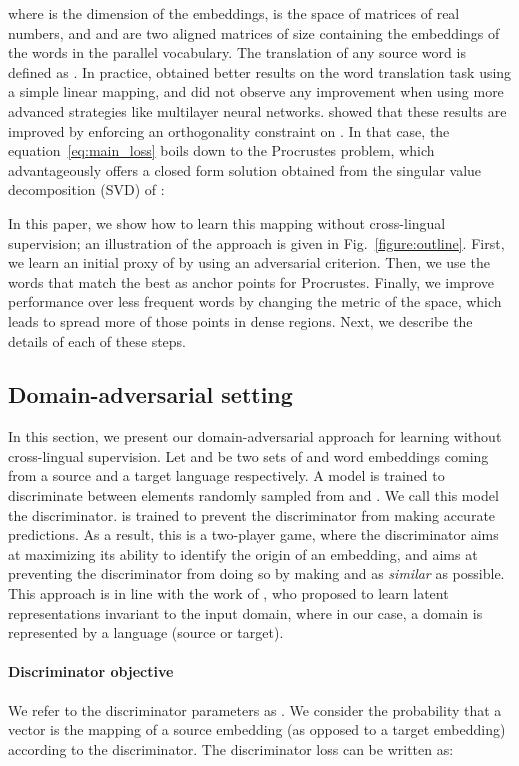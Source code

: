 \documentclass{article} \usepackage{iclr2018_conference,times}
\begin{document}
where  is the dimension of the embeddings,  is the space of  matrices of real numbers, and  and  are two aligned matrices of size  containing the embeddings of the words in the parallel vocabulary. The translation  of any source word  is defined as .
In practice, \cite{mikolov2013exploiting} obtained better results on the word translation task using a simple linear mapping, and did not observe any improvement when using more advanced strategies like multilayer neural networks. \cite{xing2015normalized} showed that these results are improved by enforcing an orthogonality constraint on . In that case, the equation~\eqref{eq:main_loss} boils down to the Procrustes problem, which advantageously offers a closed form solution obtained from the singular value decomposition (SVD) of :

In this paper, we show how to learn this mapping  without cross-lingual supervision; an illustration of the approach is given in Fig.~\ref{figure:outline}. First, we learn an initial proxy of  by using an adversarial criterion. Then, we use the words that match the best as anchor points for Procrustes. Finally, we improve performance over less frequent words by changing the metric of the space, which leads to spread more of those points in dense regions. Next, we describe the details of each of these steps.

\subsection{Domain-adversarial setting}

In this section, we present our domain-adversarial approach for learning  without cross-lingual supervision. Let  and  be two sets of  and  word embeddings coming from a source and a target language respectively. A model is trained to discriminate between elements randomly sampled from  and . We call this model the discriminator.  is trained to prevent the discriminator from making accurate predictions. As a result, this is a two-player game, where the discriminator aims at maximizing its ability to identify the origin of an embedding, and  aims at preventing the discriminator from doing so by making  and  as \textit{similar} as possible. This approach is in line with the work of \cite{ganin2016domain}, who proposed to learn latent representations invariant to the input domain, where in our case, a domain is represented by a language (source or target).

\paragraph{Discriminator objective} We refer to the discriminator parameters as . We consider the probability  that a vector  is the mapping of a source embedding (as opposed to a target embedding) according to the discriminator. The discriminator loss can be written as:
\end{document}
